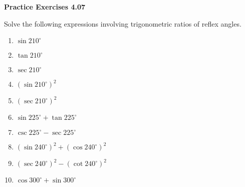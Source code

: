 \vspace{0.3ex}
\noindent\textbf{Practice Exercises 4.07}

\vspace{0.2ex}

Solve the following expressions involving trigonometric ratios of reflex angles.
\begin{multicols}{2}
\begin{enumerate}
    \item \( \sin 210^\circ\)%
    \item \( \tan 210^\circ\)%
    \item \( \sec 210^\circ \)%
    \item \( (\sin 210^\circ)^2\)%
    \item \( (\sec 210^\circ)^2 \)%
    \item \( \sin 225^\circ + \tan 225^\circ \)
    \item \( \csc 225^\circ - \sec 225^\circ \)
    \item \( (\sin 240^\circ)^2 + (\cos 240^\circ)^2 \)
    \item \( (\sec 240^\circ)^2 - (\cot 240^\circ)^2 \)
    \item \( \cos 300^\circ + \sin 300^\circ \)
\end{enumerate}
\end{multicols}
